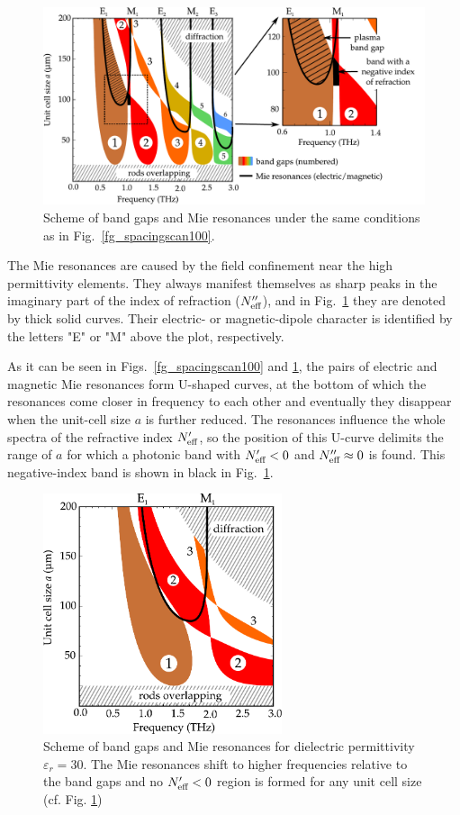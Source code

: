 \begin{figure}
    \includegraphics[width=15cm]{img/ERods_eps100_spacingscan_drawn_bands.pdf}
    \caption{Scheme of band gaps and Mie resonances under the same conditions as
    in Fig.~\ref{fg_spacingscan100}.}
\label{fg_drawn100}
\end{figure}




The Mie resonances are caused by the field confinement near the high permittivity elements. They always manifest themselves as sharp peaks in the imaginary part of the index of refraction ($N_{\text{eff} }''$), and in Fig.~\ref{fg_drawn100} they are denoted by thick solid curves. Their electric- or magnetic-dipole character is identified by the letters "E" or "M" above the plot, respectively.

As it can be seen in Figs.~\ref{fg_spacingscan100} and \ref{fg_drawn100}, the pairs of electric and magnetic Mie resonances form U-shaped curves, at the bottom of which the resonances come closer in frequency to each other and eventually they disappear when the unit-cell size $a$ is further reduced. The resonances influence the whole spectra of the refractive index $N_{\text{eff} }'$, so the position of this U-curve delimits the range of $a$ for which a photonic band with $N_{\text{eff} }' < 0$ and $N_{\text{eff} }'' \approx 0$ is found. This negative-index band is shown in black in Fig.~\ref{fg_drawn100}.

\begin{figure}
	\centering
    \includegraphics[width=7cm]{img/ERods_eps030_spacingscan_drawn_bands.pdf}
    \caption{Scheme of band gaps and Mie resonances for dielectric permittivity $\varepsilon_r = 30$. The Mie resonances shift to higher frequencies relative to the band gaps and no $N_{\text{eff} }'<0$ region is formed for any unit cell size (cf. Fig. \ref{fg_drawn100})}
\label{fg_drawn030}
\end{figure}

